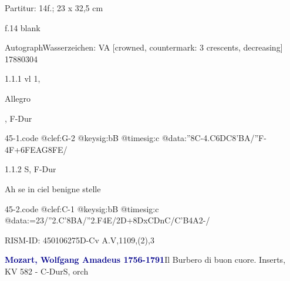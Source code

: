 \documentclass[a4paper, twocolumn, 11pt]{book}
\begin{document}
\par \textcolor{darkblue}{}  Partitur: 14f.; 23 x 32,5 cm\newline \begin{small} f.14 blank\end{small} \newline Autograph\newline Wasserzeichen: VA [crowned, countermark: 3 crescents, decreasing]  17880304
\par 1.1.1  vl 1, \begin{itshape}Allegro\end{itshape}, F-Dur  
\begin{filecontents*}{45-1.code}
@clef:G-2
@keysig:bB
@timesig:c
@data:''8C-4.C{6DC}{8'BA}/''F-4F+{6FEAG}{8FE}/
\end{filecontents*}
\newline %
\par 1.1.2  S, F-Dur\newline \begin{footnotesize} Ah se in ciel benigne stelle \end{footnotesize}  
\begin{filecontents*}{45-2.code}
@clef:C-1
@keysig:bB
@timesig:c
@data:=23/''2.C'8{BA}/''2.F4E/2D+{8DxC}{DnC}/{C'B}4A2-/
\end{filecontents*}
\newline %
\par RISM-ID: 450106275\newline D-Cv  A.V,1109,(2),3
\par \vspace{16pt} \textcolor{darkblue}{\textbf{Mozart, Wolfgang Amadeus  1756-1791}}\hfillplus{[46]}\newline Il Burbero di buon cuore. Inserts, KV 582 - C-Dur\newline S, orch
\end{document}
